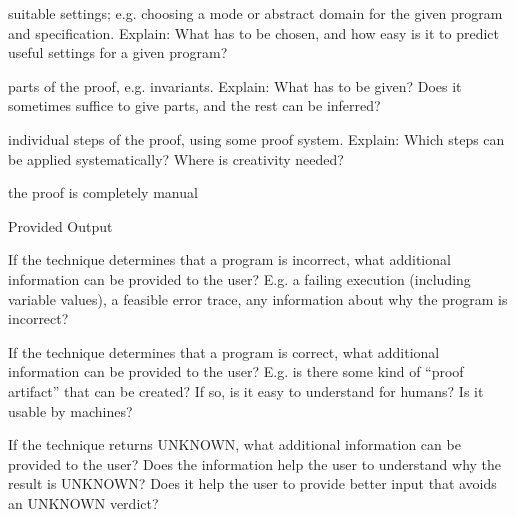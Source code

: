 \documentclass[a4paper]{article}
\begin{document}
\begin{minipage}[t]{0.16\linewidth}
\begin{betterlist}
\begin{betterlist}
			\item \checkboxUnchecked suitable settings; e.g. choosing a mode or abstract domain for the given program and specification. Explain: What has to be chosen, and how easy is it to predict useful settings for a given program?

			\item \checkboxUnchecked parts of the proof, e.g. invariants. Explain: What has to be given? Does it sometimes suffice to give parts, and the rest can be inferred?

			\item \checkboxUnchecked individual steps of the proof, using some proof system. Explain: Which steps can be applied systematically? Where is creativity needed?

			\item \checkboxUnchecked the proof is completely manual
		\end{betterlist}
		\item \alert{Provided Output}
		\begin{betterlist}
			\item If the technique determines that a program is incorrect, what additional information can be provided to the user? E.g. a failing execution (including variable values), a feasible error trace, any information about why the program is incorrect?

			\item If the technique determines that a program is correct, what additional information can be provided to the user? E.g. is there some kind of \enquote{proof artifact} that can be created? If so, is it easy to understand for humans? Is it usable by machines?

			\item If the technique returns UNKNOWN, what additional information can be provided to the user? Does the information help the user to understand why the result is UNKNOWN? Does it help the user to provide better input that avoids an UNKNOWN verdict?


\end{betterlist}
\end{betterlist}
\end{minipage}
\end{document}
